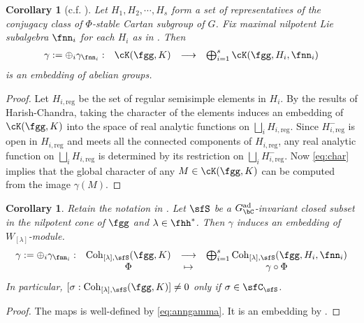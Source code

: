 \documentclass[12pt,a4paper]{amsart}
\numberwithin{equation}{section}
\newtheorem{cor}[thm]{Corollary}
\theoremstyle{remark}
\def\Gcad{G_\bC^{\text{ad}}}
\def\Wlam{W_{[\lambda]}}
\def\Coh{\mathrm{Coh}}
\def\Hireg{H_{i,\text{reg}}}
\def\Hnireg{H^-_{i,\text{reg}}}
\newcommand{\Grt}{\cK}
\begin{document}

\begin{cor}[c.f. {\cite{Mc}}]\label{cor:HC.embed}
  Let $H_{1}, H_{2}, \cdots, H_{s}$ form a set of representatives of the
  conjugacy class of $\Phi$-stable Cartan subgroup of $G$. Fix maximal
  nilpotent Lie subalgebra $\fnn_{i}$ for each $H_{i}$ as in
  . Then
  \[
    \begin{array}{cccc}
      \gamma:=\oplus_{i} \gamma_{\fnn_{i}}: &\Grt(\fgg,K)
      &\longrightarrow & \bigoplus_{i=1}^{s} \Grt(\fgg,H_{i},\fnn_{i})\\
    \end{array}
  \]
  is an embedding of abelian groups.
\end{cor}
\begin{proof}
  Let $\Hireg$ be the set of regular semisimple elements in $H_{i}$. By the
  results of Harish-Chandra, taking the character of the elements induces an
  embedding of $\Grt(\fgg,K)$ into the space of real analytic functions on
  $\bigsqcup_{i} \Hireg$. Since $\Hnireg$ is open in $\Hireg$ and meets all the
  connected components of $\Hireg$, any real analytic function on
  $\bigsqcup_{i} \Hireg$ is determined by its restriction on
  $\bigsqcup_{i} \Hnireg$. Now \eqref{eq:char} implies that the global character
  of any $M\in \Grt(\fgg,K)$ can be computed from the image $\gamma(M)$.
\end{proof}

\begin{cor}\label{cor:coh.HC}
  Retain the notation in .
  Let $\sfS$ be a $\Gcad$-invariant closed subset in the nilpotent cone of
  $\fgg$ and $\lambda\in \fhh^{*}$.
  Then $\gamma$ induces an embedding of $\Wlam$-module.
  \[
    \begin{array}{cccc}
      \gamma:=\oplus_{i} \gamma_{\fnn_{i}}: &\Coh_{[\lambda],\sfS}(\fgg,K)
      &\longrightarrow & \bigoplus_{i=1}^{s} \Coh_{[\lambda],\sfS}(\fgg,H_{i},\fnn_{i})\\
      &\Phi& \mapsto &\gamma\circ \Phi
    \end{array}
  \]
  In particular, $[\sigma:\Coh_{[\lambda],\sfS}(\fgg,K)]\neq 0$ only if
  $\sigma\in \sfC_{\sfS}$.
\end{cor}
\begin{proof}
  The maps is well-defined by \eqref{eq:anngamma}. It is an embedding by
  .
\end{proof}
\end{document}
